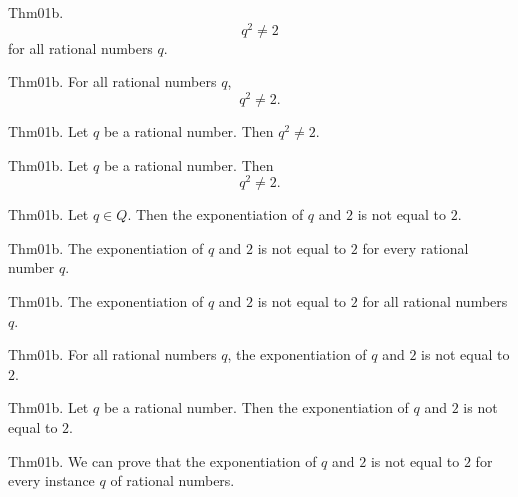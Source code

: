 \documentclass{article}
\begin{document}
Thm01b. $$q ^ {2}\neq 2$$ for all rational numbers $q$.

Thm01b. For all rational numbers $q$, $$q ^ {2}\neq 2.$$

Thm01b. Let $q$ be a rational number. Then $q ^ {2}\neq 2$.

Thm01b. Let $q$ be a rational number. Then $$q ^ {2}\neq 2.$$

Thm01b. Let $q \in Q$. Then the exponentiation of $q$ and $2$ is not equal to $2$.

Thm01b. The exponentiation of $q$ and $2$ is not equal to $2$ for every rational number $q$.

Thm01b. The exponentiation of $q$ and $2$ is not equal to $2$ for all rational numbers $q$.

Thm01b. For all rational numbers $q$, the exponentiation of $q$ and $2$ is not equal to $2$.

Thm01b. Let $q$ be a rational number. Then the exponentiation of $q$ and $2$ is not equal to $2$.

Thm01b. We can prove that the exponentiation of $q$ and $2$ is not equal to $2$ for every instance $q$ of rational numbers.
\end{document}
